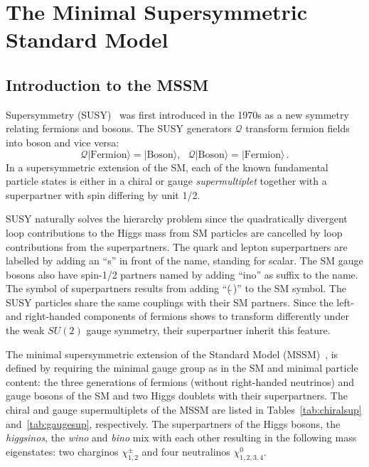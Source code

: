  
\section{The Minimal Supersymmetric Standard Model}\label{sec:MSSM}
\subsection{Introduction to the MSSM}
Supersymmetry (SUSY)~\cite{Susy1,Susy2,Susy3} was first introduced in the 1970s as a new symmetry relating fermions and bosons.
The SUSY generators $\mathcal{Q}$ transform fermion fields into boson and vice versa:
\begin{equation}
\mathcal{Q}|\text{Fermion}\rangle = |\text{Boson}\rangle, ~ ~ ~ \mathcal{Q}|\text{Boson}\rangle = |\text{Fermion}\rangle\,.
\end{equation}
In a supersymmetric extension of the SM,  each of the known fundamental particle states 
is  either in  a chiral or gauge \emph{supermultiplet} together with a superpartner with spin differing by unit 1/2.

SUSY naturally solves the hierarchy problem since the quadratically divergent loop contributions to the Higgs mass from  SM 
particles are cancelled  by  loop contributions from the superpartners. 
The quark and lepton  superpartners are labelled by adding an ``s'' in front of the name, standing for scalar. 
The SM gauge bosons also have spin-1/2 partners named by adding ``ino'' as suffix to the name. 
The symbol of superpartners results from adding ``($\tilde{ ~ }$)'' to the SM symbol.
The SUSY particles share the same couplings with their SM partners. 
Since the left- and right-handed components of fermions shows to transform differently under the weak $SU(2)$ gauge symmetry,
their superpartner inherit this feature.

The  minimal supersymmetric extension of the Standard Model  (MSSM)~\cite{MSSM1,MSSM2,MSSM3,MSSM4,MSSM5,MSSM6}, 
is defined by requiring the minimal gauge group as in the SM and 
minimal particle content: the three generations of fermions (without right-handed neutrinos) and gauge bosons of the SM  and two Higgs doublets 
with their superpartners. The  chiral and gauge supermultiplets of the MSSM 
are listed in Tables~\ref{tab:chiralsup} and~\ref{tab:gaugesup}, respectively.
The superpartners of the Higgs bosons, the \emph{higgsinos},  the \emph{wino} and \emph{bino} 
mix with each other resulting in the following mass eigenstates: two charginos $\chi_{1,2}^\pm$ and four neutralinos $\chi_{1,2,3,4}^0$.

